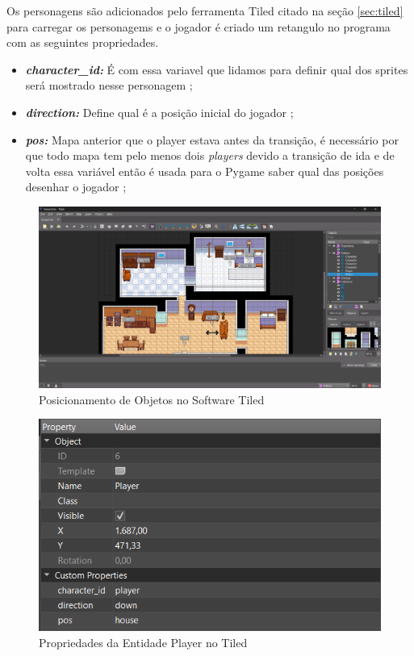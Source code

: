 Os personagens são adicionados pelo ferramenta Tiled citado na seção \ref{sec:tiled} para carregar os personagems e o jogador é criado um retangulo no programa com as seguintes propriedades.
\begin{itemize}
    \item \textbf{\textit{character\_id: }}É com essa variavel que lidamos para definir qual dos sprites será mostrado nesse personagem ;
    \item \textbf{\textit{direction: }}Define qual é a posição inicial do jogador ;
    \item \textbf{\textit{pos: }}Mapa anterior que o player estava antes da transição, é necessário por que todo mapa tem pelo menos dois \textit{players} devido a transição de ida e de volta essa variável então é usada para o Pygame saber qual das posições desenhar o jogador ;
\end{itemize}

\begin{figure}[h!]
    \centering
    \includegraphics[width=1\linewidth]{figuras/tiled-house.png}
    \caption{Posicionamento de Objetos no Software Tiled }
    \label{fig:tiled-house}
\end{figure}

\begin{figure}[h!]
    \centering
    \includegraphics[width=1\linewidth]{figuras/tiled-player-properties.png}
    \caption{Propriedades da Entidade Player no Tiled}
    \label{fig:tiled-player-propertiesl}
\end{figure}


